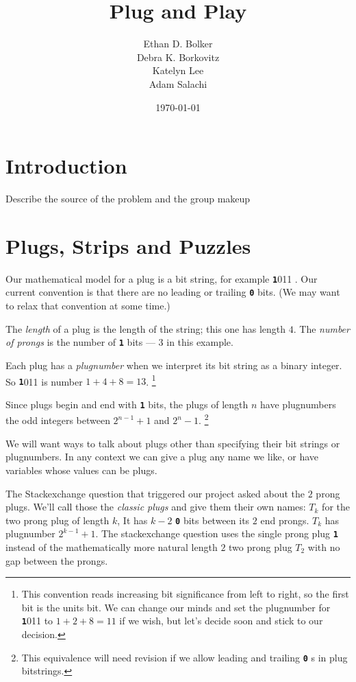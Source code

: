 \documentclass[10pt]{article}
\title{Plug and Play}
\author{
Ethan D. Bolker \\
Debra K. Borkovitz\\
  Katelyn Lee\\
  Adam Salachi
}
\date{\today}
\numberwithin{equation}{section}
\newenvironment{anote}
               {{\textcolor{blue}{Note:}}
                 \itshape
               }
               {}
\newcommand{\plug}[1]{%
\mbox{{\textbf\texttt #1}}
}
\begin{document}
\maketitle

\section{Introduction}

\begin{anote}
Describe the source of the problem and the group makeup
\end{anote}


\section{Plugs, Strips and Puzzles}

Our mathematical model for a plug is a bit string, for example
\plug{1011}. Our current convention is that there are no leading or
trailing \plug{0} bits. (We may want to relax that convention at some
time.)

The \emph{length} of a plug is the length of the string; this one has
length $4$. The \emph{number of prongs} is the number of \plug{1} bits
--- $3$ in this example.

Each plug has a \emph{plugnumber} when we
interpret its bit string as a binary integer. So \plug{1011} is
number $1 + 4 + 8 = 13$.%
\footnote{This convention reads increasing bit significance from left
  to right, so the first bit is the units bit. We can change our minds
  and set the plugnumber for \plug{1011} to $1+2+8 = 11$ if we wish,
  but let's decide soon and stick to our decision.}

Since plugs begin and end with \plug{1} bits,
the plugs of length $n$ have plugnumbers the odd integers between
$2^{n-1} +1$ and $2^n -1$.
\footnote{This equivalence will need revision if we allow leading and
  trailing \plug{0}s in plug bitstrings.}

We will want ways to talk about plugs other than specifying their bit
strings or plugnumbers. In any context we can give a plug any name we
like, or have variables whose values can be plugs.

The Stackexchange question that triggered our project asked about
the $2$ prong plugs. We'll call those the \emph{classic plugs} and give
them their own names: $T_k$ for the two prong plug of length $k$, It
has $k-2$ \plug{0} bits between its $2$ end prongs. $T_k$ has plugnumber $2^{k-1} + 1$.
 The stackexchange question uses the single prong plug \plug{1}{} instead of the mathematically more natural length $2$ two prong plug $T_2$ with no gap between the prongs.
 
\end{document}
